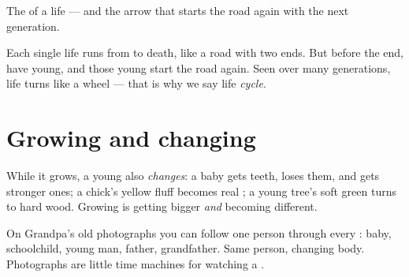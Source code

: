 \begin{omfigure}

{\small The  of a life --- and the arrow that starts the road
again with the next generation.}
\end{omfigure}

\begin{remark}\label{rem:g2:born-grow-die:wheel}
Each single life runs from  to death, like a road with two
ends. But before the end,  have young, and those young start
the road again. Seen over many generations, life turns like a
wheel --- that is why we say life \emph{cycle}.
\end{remark}

\section{Growing and changing}

\begin{proposition}\label{prop:g2:born-grow-die:change}
While it grows, a young  also \emph{changes}: a baby
gets teeth, loses them, and gets stronger ones; a chick's yellow
fluff becomes real ; a young tree's soft green  turns
to hard wood. Growing is getting bigger \emph{and} becoming
different.
\end{proposition}
\admitted

\begin{example}\label{ex:g2:born-grow-die:photo}
On Grandpa's old photographs you can follow one person through
every : baby, schoolchild, young man, father, grandfather.
Same person, changing body. Photographs are little time machines
for watching a .
\end{example}

